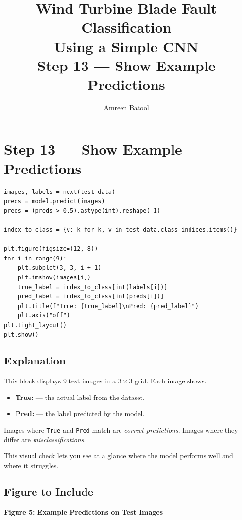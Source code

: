 \documentclass[12pt]{article}
\title{\textbf{Wind Turbine Blade Fault Classification\\Using a Simple CNN}\\[0.5em]
\large Step 13 --- Show Example Predictions}
\author{Amreen Batool}
\date{}
\begin{document}
\maketitle

\section*{Step 13 --- Show Example Predictions}

\begin{lstlisting}[style=pythonstyle]
images, labels = next(test_data)
preds = model.predict(images)
preds = (preds > 0.5).astype(int).reshape(-1)

index_to_class = {v: k for k, v in test_data.class_indices.items()}

plt.figure(figsize=(12, 8))
for i in range(9):
    plt.subplot(3, 3, i + 1)
    plt.imshow(images[i])
    true_label = index_to_class[int(labels[i])]
    pred_label = index_to_class[int(preds[i])]
    plt.title(f"True: {true_label}\nPred: {pred_label}")
    plt.axis("off")
plt.tight_layout()
plt.show()
\end{lstlisting}

\subsection*{Explanation}

This block displays 9 test images in a $3 \times 3$ grid. Each image shows:
\begin{itemize}
    \item \textbf{True:} --- the actual label from the dataset.
    \item \textbf{Pred:} --- the label predicted by the model.
\end{itemize}

Images where \texttt{True} and \texttt{Pred} match are \textit{correct predictions}. Images where they differ are \textit{misclassifications}.

This visual check lets you see at a glance where the model performs well and where it struggles.

\subsection*{Figure to Include}

\textbf{Figure 5: Example Predictions on Test Images}
\end{document}
